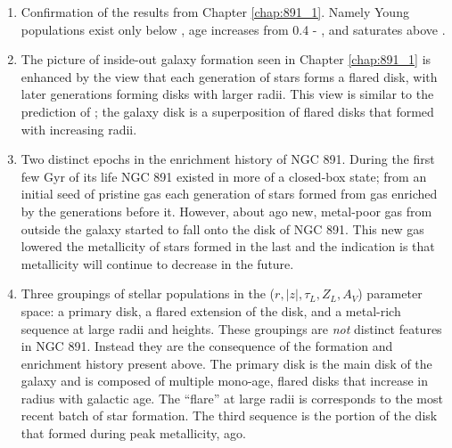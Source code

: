 \begin{enumerate}

\item Confirmation of the results from Chapter
  \ref{chap:891_1}. Namely Young populations exist only below
  , age increases from 0.4 - , and saturates
  above .

\item The picture of inside-out galaxy formation seen in Chapter
  \ref{chap:891_1} is enhanced by the view that each generation of
  stars forms a flared disk, with later generations forming disks with
  larger radii. This view is similar to the prediction of
  \citet{Martig14a}; the galaxy disk is a superposition of flared
  disks that formed with increasing radii.

\item Two distinct epochs in the enrichment history of NGC 891. During
  the first few Gyr of its life NGC 891 existed in more of a
  closed-box state; from an initial seed of pristine gas each
  generation of stars formed from gas enriched by the generations
  before it. However, about  ago new, metal-poor gas
  from outside the galaxy started to fall onto the disk of NGC
  891. This new gas lowered the metallicity of stars formed in the
  last  and the indication is that metallicity will
  continue to decrease in the future.

\item Three groupings of stellar populations in the
  ($r,|z|,\tau_L,Z_L,A_V$) parameter space: a primary disk, a flared
  extension of the disk, and a metal-rich sequence at large radii and
  heights. These groupings are \emph{not} distinct features in NGC
  891. Instead they are the consequence of the formation and
  enrichment history present above. The primary disk is the main disk
  of the galaxy and is composed of multiple mono-age, flared disks
  that increase in radius with galactic age. The ``flare'' at large
  radii is corresponds to the most recent batch of star formation. The
  third sequence is the portion of the disk that formed during peak
  metallicity,  ago.

\end{enumerate}

  

